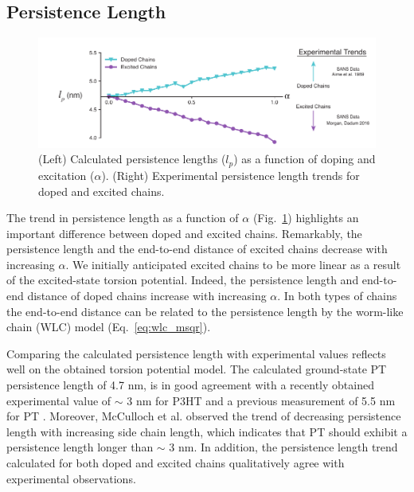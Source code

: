 \subsection{Persistence Length}

\begin{figure}[hbt!]
    \centering
    \includegraphics{figures/chap2/persist_len.pdf}
    \caption[Persistence Length Trends for Doped and Excited Chains]{(Left) Calculated persistence lengths ($l_p$) as a function of doping and excitation ($\alpha$). (Right) Experimental persistence length trends for doped and excited chains.}
    \label{fig:lp}
\end{figure}

The trend in persistence length as a function of $\alpha$ (Fig.~\ref{fig:lp}) highlights an important difference between doped and excited chains. Remarkably, the persistence length and the end-to-end distance of excited chains decrease with increasing $\alpha$. We initially anticipated excited chains to be more linear as a result of the excited-state torsion potential. Indeed, the persistence length and end-to-end distance of doped chains increase with increasing $\alpha$. In both types of chains the end-to-end distance can be related to the persistence length by the worm-like chain (WLC) model (Eq.~\ref{eq:wlc_msqr}).

Comparing the calculated persistence length with experimental values reflects well on the obtained torsion potential model. The calculated ground-state PT persistence length of 4.7 nm, is in good agreement with a recently obtained experimental value of $\sim$ 3 nm for P3HT \cite{Mcculloch2013} and a previous measurement of 5.5 nm for PT \cite{Aime1989}. Moreover, McCulloch et al. observed the trend of decreasing persistence length with increasing side chain length, which indicates that PT should exhibit a persistence length longer than $\sim$ 3 nm. In addition, the persistence length trend calculated for both doped and excited chains qualitatively agree with experimental observations.

